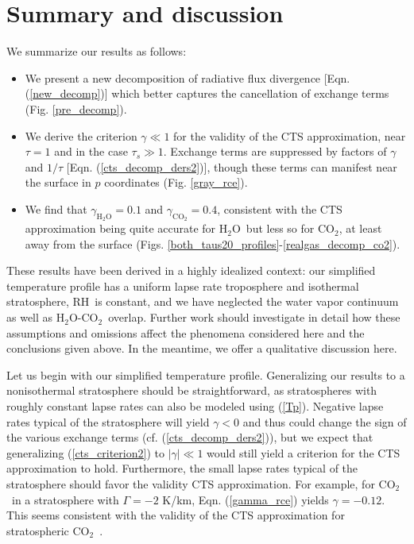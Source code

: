 \documentclass{ametsoc}
\newcommand{\eqnref}[1]{(\ref{#1})}
\newcommand{\cotwo}{\ensuremath{\mathrm{CO_2}}}
\newcommand{\htwo}{\ensuremath{\mathrm{H_2O}}}
\newcommand{\RH}{\ensuremath{\mathrm{RH}}}
\newcommand{\taus}{\ensuremath{\tau_s}}
\begin{document}
\section{Summary and discussion} \label{sec_summary}
We summarize our results as follows:
\begin{itemize}
	\item We present a new decomposition of radiative flux divergence [Eqn. \eqnref{new_decomp}] which better captures the cancellation of exchange terms (Fig. \ref{pre_decomp}).
	\item We derive the criterion $\gamma \ll 1$ for the validity of the CTS approximation, near $\tau=1$ and in the case $\taus \gg 1$. Exchange terms are suppressed by factors of $\gamma$ and $1/\tau$ [Eqn. \eqnref{cts_decomp_ders2}], though these terms can manifest near the surface in $p$ coordinates (Fig. \ref{gray_rce}). 

	\item  We find that  $\gamma_{\htwo}  =  0.1$  and $\gamma_{\cotwo}  =  0.4$, consistent with the CTS approximation being quite accurate for \htwo\ but less so for \cotwo, at least away from the surface (Figs. \ref{both_taus20_profiles}-\ref{realgas_decomp_co2}).
\end{itemize}

These results have been derived in a highly idealized context: our simplified temperature profile has a uniform lapse rate troposphere and isothermal stratosphere, \RH\ is constant, and we have neglected the water vapor continuum as well as \htwo-\cotwo\ overlap. Further work should investigate in detail how these assumptions and omissions affect the phenomena considered here and the conclusions given above. In the meantime, we offer a qualitative discussion here.

Let us begin with our simplified temperature profile. Generalizing our results to a nonisothermal stratosphere should be straightforward, as stratospheres with roughly constant lapse rates can also be modeled using \eqnref{Tp}. Negative lapse rates typical of the stratosphere will yield $\gamma<0$ and thus could change the sign of the various exchange terms (cf. \eqnref{cts_decomp_ders2}), but we expect that generalizing \eqnref{cts_criterion2} to $|\gamma| \ll 1$ would still yield a criterion for the CTS approximation to hold. Furthermore, the small lapse rates typical of the stratosphere should favor the validity CTS approximation.  For example, for \cotwo\ in a stratosphere with $\Gamma = -2$ K/km, Eqn. \eqnref{gamma_rce} yields $\gamma = -0.12$. This seems consistent with the validity of the CTS approximation for stratospheric \cotwo\ \citep[e.g.][Fig. 2a,c]{rodgers1966}.
\end{document}
